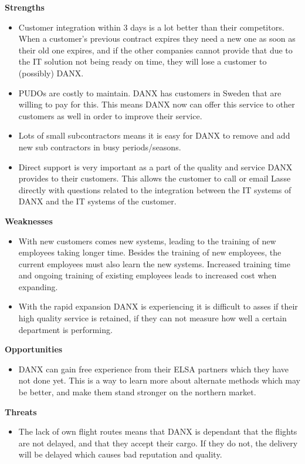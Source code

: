 \textbf{Strengths}
\begin{itemize}
\item Customer integration within 3 days is a lot better than their competitors. When a customer’s previous contract expires they need a new one as soon as their old one expires, and if the other companies cannot provide that due to the IT solution not being ready on time, they will lose a customer to (possibly) DANX.
\item PUDOs are costly to maintain. DANX has customers in Sweden that are willing to pay for this. This means DANX now can offer this service to other customers as well in order to improve their service.\cite{gert023}
\item Lots of small subcontractors means it is easy for DANX to remove and add new sub contractors in busy periods/seasons.
\item Direct support is very important as a part of the quality and service DANX provides to their customers. This allows the customer to call or email Lasse directly with questions related to the integration between the IT systems of DANX and the IT systems of the customer.
\end{itemize}

\textbf{Weaknesses}
\begin{itemize}
\item With new customers comes new systems, leading to the training of new employees taking longer time.\cite{opemployee001} Besides the training of new employees, the current employees must also learn the new systems. Increased training time and ongoing training of existing employees leads to increased cost when expanding.
\item With the rapid expansion DANX is experiencing it is difficult to asses if their high quality service is retained, if they can not measure how well a certain department is performing.
\end{itemize}

\textbf{Opportunities}
\begin{itemize}
\item DANX can gain free experience from their ELSA partners which they have not done yet. This is a way to learn more about alternate methods which may be better, and make them stand stronger on the northern market.\cite{gert010}
\end{itemize}

\textbf{Threats}
\begin{itemize}
\item The lack of own flight routes means that DANX is dependant that the flights are not delayed, and that they accept their cargo. If they do not, the delivery will be delayed which causes bad reputation and quality.
\end{itemize}

